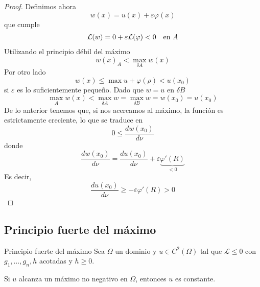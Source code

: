 \begin{proof}
Definimos ahora
$$w(x) = u(x) +\varepsilon\varphi(x)$$
que cumple
\begin{equation*}
\begin{array}{l r}
\mathcal{L}(w) = 0 + \varepsilon\mathcal{L}(\varphi) < 0 & \text{en } A
\end{array}
\end{equation*}
Utilizando el principio débil del máximo
$$w(x)_A < \max_{\delta A}w(x)$$
Por otro lado
$$w(x) \le \max u + \varphi(\rho) < u(x_0)$$
si $\varepsilon$ es lo suficientemente pequeño.
Dado que $w = u$ en $\delta B$
$$\max_{A} w(x) < \max_{\delta A} w = \max_{\delta B} w = w(x_0) = u(x_0)$$
De lo anterior tenemos que, si nos acercamos al máximo, la función es estrictamente creciente, lo que se traduce en
$$0\le\frac{dw(x_0)}{d\nu}$$
donde
$$\frac{dw(x_0)}{d\nu} = \frac{du(x_0)}{d\nu} + \varepsilon\underbrace{\varphi'(R)}_{<0}$$
Es decir,
$$\frac{du(x_0)}{d\nu} \ge -\varepsilon\varphi'(R) > 0$$
\end{proof}


\subsection{Principio fuerte del máximo}
\begin{mathresult}{Principio fuerte del máximo}
Sea $\Omega$ un dominio y $u\in C^2(\Omega)$ tal que $\mathcal{L} \le 0$ con $g_1,\hdots,g_n,h$ acotadas y $h\ge 0$.

\noindent Si $u$ alcanza un máximo no negativo en $\Omega$, entonces $u$ es constante.
\end{mathresult}

